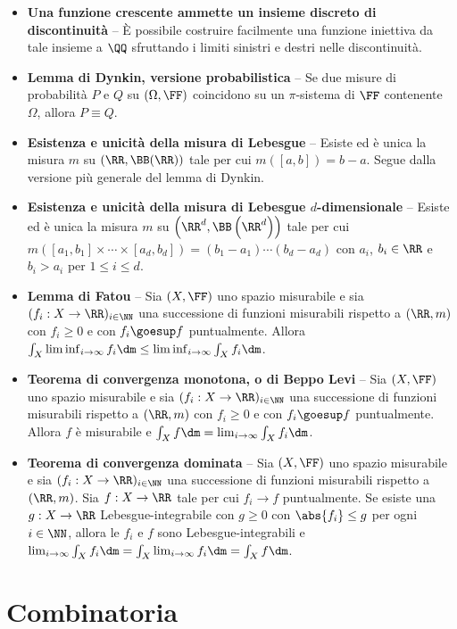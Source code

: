 \begin{multicols*}{2}
\begin{itemize}
    \item \textbf{Una funzione crescente ammette un insieme discreto di discontinuità} --
    È possibile costruire facilmente una funzione iniettiva da tale insieme a $\QQ$ sfruttando
    i limiti sinistri e destri nelle discontinuità.
    \item \textbf{Lemma di Dynkin, versione probabilistica} -- Se
    due misure di probabilità $P$ e $Q$ su $(\Omega, \FF)$ coincidono su un $\pi$-sistema di $\FF$
    contenente $\Omega$, allora $P \equiv Q$.
    \item \textbf{Esistenza e unicità della misura di Lebesgue} -- Esiste ed
    è unica la misura $m$ su $(\RR, \BB(\RR))$ tale per cui
    $m([a, b]) = b-a$. Segue dalla versione più generale del lemma di Dynkin.
    \item \textbf{Esistenza e unicità della misura di Lebesgue $d$-dimensionale} -- Esiste ed
    è unica la misura $m$ su $\left(\RR^d, \BB\left(\RR^d\right)\right)$ tale per cui
    $m\left([a_1, b_1] \times \cdots \times [a_d, b_d]\right) = (b_1 - a_1) \cdots (b_d - a_d)$ con $a_i$, $b_i \in \RR$ e
    $b_i > a_i$ per $1 \leq i \leq d$.
    \item \textbf{Lemma di Fatou} --
    Sia $(X, \FF)$ uno spazio misurabile e sia $(f_i : X \to \RR)_{i \in \NN}$ una successione di funzioni misurabili rispetto
    a $(\RR, m)$ con $f_i \geq 0$ e con
    $f_i \goesup f$ puntualmente. Allora $\int_X \liminf_{i \to \infty} f_i \dm \leq \liminf_{i \to \infty} \int_X f_i \dm$.
    \item \textbf{Teorema di convergenza monotona, o di Beppo Levi} --
    Sia $(X, \FF)$ uno spazio misurabile e sia $(f_i : X \to \RR)_{i \in \NN}$ una successione di funzioni misurabili rispetto
    a $(\RR, m)$ con $f_i \geq 0$ e con
    $f_i \goesup f$ puntualmente. Allora $f$ è misurabile e $\int_X f \dm = \lim_{i \to \infty} \int_X f_i \dm$.
    \item \textbf{Teorema di convergenza dominata} --
    Sia $(X, \FF)$ uno spazio misurabile e sia $(f_i : X \to \RR)_{i \in \NN}$ una successione di funzioni misurabili rispetto
    a $(\RR, m)$. Sia $f : X \to \RR$ tale per cui
    $f_i \to f$ puntualmente. Se esiste una
    $g : X \to \RR$ Lebesgue-integrabile con $g \geq 0$ con
    $\abs{f_i} \leq g$ per ogni $i \in \NN$, allora le $f_i$ e $f$
    sono Lebesgue-integrabili e $\lim_{i \to \infty} \int_X f_i \dm = \int_X \lim_{i \to \infty} f_i \dm = \int_X f \dm$.
\end{itemize}

\section*{Combinatoria}


\end{multicols*}
